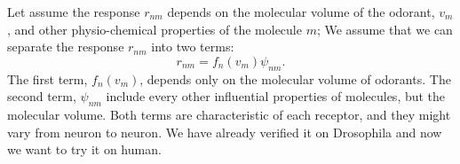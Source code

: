 \documentclass[a1paper,fontscale=0.5]{baposter} %
\begin{document}
\begin{poster}
{Let assume the response $r_{nm}$ depends on the molecular volume of the odorant, $v_m$, and other physio-chemical properties of the molecule $m$; 
We assume that we can separate the response $r_{nm}$ into two terms:
\begin{equation}
	r_{nm} = f_n(v_m) \psi_{nm}. \nonumber
	\label{eqn:factors}
\end{equation}
The first term, $f_n(v_m)$, depends only on the molecular volume of odorants.
The second term, $\psi_{nm}$ include every other influential properties of molecules, but the molecular volume.
Both terms are characteristic of each receptor, and they might vary from neuron to neuron.
We have already verified it on Drosophila \cite{saberi} and now we want to try it on human. 
}




%
%
%



\end{poster}
\end{document}
